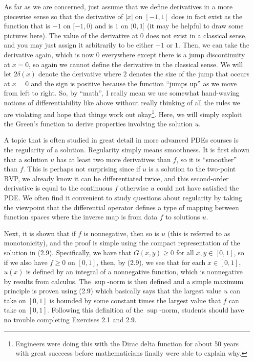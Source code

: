 \documentclass{amsart}
\theoremstyle{plain}
\theoremstyle{definition}
\theoremstyle{remark}
\theoremstyle{definition}
\numberwithin{equation}{section}
\numberwithin{equation}{section}
\newcommand{\abs}[1]{\left\vert#1\right\vert}
\begin{document}
As far as we are concerned, just assume that we define derivatives in a more piecewise sense so that the derivative of $\abs{x}$ on $[-1,1]$ does in fact exist as the function that is $-1$ on $[-1,0)$ and is $1$ on $(0,1]$ (it may be helpful to draw some pictures here).
The value of the derivative at $0$ does not exist in a classical sense, and you may just assign it arbitrarily to be either $-1$ or $1$. 
Then, we can take the derivative again, which is now $0$ everywhere except there is a jump discontinuity at $x=0$, so again we cannot define the derivative in the classical sense.
We will let $2\delta(x)$ denote the derivative where $2$ denotes the size of the jump that occurs at $x=0$ and the sign is positive because the function ``jumps up'' as we move from left to right. 
So, by ``math'', I really mean we use somewhat hand-waving notions of differentiability like above without really thinking of all the rules we are violating and hope that things work out okay\footnote{Engineers were doing this with the Dirac delta function for about 50 years with great succcess before mathematicians finally were able to explain why.}.
Here, we will simply exploit the Green's function to derive properties involving the solution $u$.

A topic that is often studied in great detail in more advanced PDEs courses is the regularity of a solution.
Regularity simply means smoothness.
It is first shown that a solution $u$ has at least two more derivatives than $f$, so it is ``smoother'' than $f$.
This is perhaps not surprising since if $u$ is a solution to the two-point BVP, we already know it can be differentiated twice, and this second-order derivative is equal to the continuous $f$ otherwise $u$ could not have satisfied the PDE. 
We often find it convenient to study questions about regularity by taking the viewpoint that the differential operator defines a type of mapping between function spaces where the inverse map is from data $f$ to solutions $u$. 

Next, it is shown that if $f$ is nonnegative, then so is $u$ (this is referred to as monotonicity), and the proof is simple using the compact representation of the solution in (2.9).
Specifically, we have that $G(x,y)\geq 0$ for all $x,y\in[0,1]$, so if we also have $f\geq 0$ on $[0,1]$, then, by (2.9), we see that for each $x\in[0,1]$, $u(x)$ is defined by an integral of a nonnegative function, which is nonnegative by results from calculus. 
The $\sup$-norm is then defined and a simple maximum principle is proven using (2.9) which basically says that the largest value $u$ can take on $[0,1]$ is bounded by some constant times the largest value that $f$ can take on $[0,1]$. 
Following this definition of the $\sup$-norm, students should have no trouble completing Exercises 2.1 and 2.9.
\end{document}
